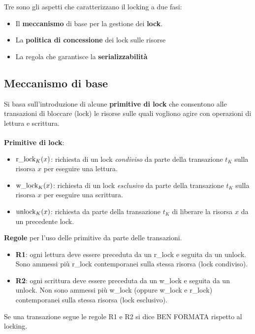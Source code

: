 \documentclass[a4paper, 10pt]{article}
\theoremstyle{definition}
\begin{document}
			Tre sono gli aspetti che caratterizzano il locking a due
			fasi:
			\begin{itemize}
				\item Il \textbf{meccanismo} di base per la gestione dei \textbf{lock}.
				\item La \textbf{politica di concessione} dei lock sulle risorse
				\item La regola che garantisce la \textbf{serializzabilità}
			\end{itemize}
			
		\subsection*{Meccanismo di base}
			Si basa sull'introduzione di alcune \textbf{primitive di lock} che
			consentono alle transazioni di bloccare (lock) le risorse sulle
			quali vogliono agire con operazioni di lettura e scrittura.
			\\\\
			\textbf{Primitive di lock}:
			\begin{itemize}
				\item $ \textup{r\_lock}_K (x) $: richiesta di un lock \textit{condiviso} da parte della
				transazione $ t_K $ sulla risorsa $ x $ per eseguire una lettura.
				\item $ \textup{w\_lock}_K (x) $: richiesta di un lock \textit{esclusivo} da parte della
				transazione $ t_K $ sulla risorsa $ x $ per eseguire una scrittura.
				\item $ \textup{unlock}_K (x) $: richiesta da parte della transazione $ t_K $ di
				liberare la risorsa $ x $ da un precedente lock.
				
			\end{itemize}
			\textbf{Regole} per l'uso delle primitive da parte delle transazioni.
			\begin{itemize}
				\item \textbf{R1}: ogni lettura deve essere preceduta da un r\_lock e
				seguita da un unlock. Sono ammessi più r\_lock
				contemporanei sulla stessa risorsa (lock condiviso).
				\item \textbf{R2}: ogni scrittura deve essere preceduta da un w\_lock e
				seguita da un unlock. Non sono ammessi più w\_lock
				(oppure w\_lock e r\_lock) contemporanei sulla stessa
				risorsa (lock esclusivo).
			\end{itemize} 
			Se una transazione segue le regole R1 e R2 si dice BEN FORMATA rispetto al locking.
			\newpage
			
\end{document}

